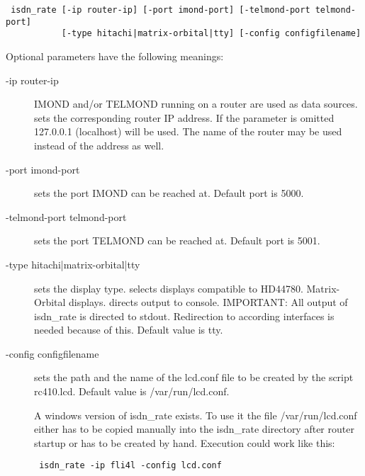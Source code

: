 \begin{example}
\begin{verbatim}
 isdn_rate [-ip router-ip] [-port imond-port] [-telmond-port telmond-port]
           [-type hitachi|matrix-orbital|tty] [-config configfilename]
\end{verbatim}
\end{example}

 Optional parameters have the following meanings:

\begin{description}
\item[-ip router-ip]

        IMOND and/or TELMOND running on a router are used as data sources. 
         sets the corresponding router IP address.
        If the parameter is omitted 127.0.0.1 (localhost) will be used.
        The name of the router may be used instead of the address as well.
        
\item[-port imond-port]
         sets the port IMOND can be reached at.          
        Default port is 5000.
        
\item[-telmond-port telmond-port]
         sets the port TELMOND can be reached at.
        Default port is 5001.
        
\item[-type hitachi|matrix-orbital|tty]
         sets the display type.
         selects displays compatible to HD44780.
         Matrix-Orbital displays.
         directs output to console.
        IMPORTANT: All output of isdn\_rate is directed to stdout. Redirection to 
        according interfaces is needed because of this.
        Default value is tty.

\item[-config configfilename]
         sets the path and the name of the lcd.conf file to be created by 
        the script rc410.lcd. Default value is /var/run/lcd.conf.
        
A windows version of isdn\_rate exists. To use it the file /var/run/lcd.conf either 
has to be copied manually into the isdn\_rate directory after router startup or has to 
be created by hand.
Execution could work like this:
\begin{example}
\begin{verbatim}
 isdn_rate -ip fli4l -config lcd.conf
\end{verbatim}
\end{example}
               
\end{description}

